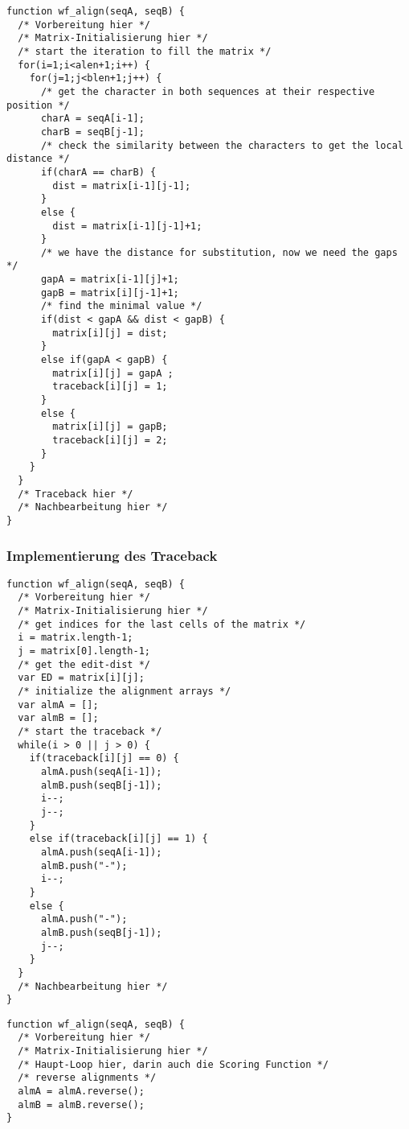 \begin{verbatim}
function wf_align(seqA, seqB) {
  /* Vorbereitung hier */  
  /* Matrix-Initialisierung hier */ 
  /* start the iteration to fill the matrix */
  for(i=1;i<alen+1;i++) {
    for(j=1;j<blen+1;j++) {      
      /* get the character in both sequences at their respective position */
      charA = seqA[i-1];
      charB = seqB[j-1];      
      /* check the similarity between the characters to get the local distance */
      if(charA == charB) {
        dist = matrix[i-1][j-1];
      }
      else {
        dist = matrix[i-1][j-1]+1;
      }      
      /* we have the distance for substitution, now we need the gaps */
      gapA = matrix[i-1][j]+1;
      gapB = matrix[i][j-1]+1;    
      /* find the minimal value */
      if(dist < gapA && dist < gapB) {
        matrix[i][j] = dist;
      }
      else if(gapA < gapB) {
        matrix[i][j] = gapA ;
        traceback[i][j] = 1;
      }
      else {
        matrix[i][j] = gapB;
        traceback[i][j] = 2;
      }
    }
  }
  /* Traceback hier */
  /* Nachbearbeitung hier */
}
\end{verbatim}


\subsubsection{\texorpdfstring{{Implementierung des
Traceback}}{Implementierung des Traceback}}

\begin{verbatim}
function wf_align(seqA, seqB) {
  /* Vorbereitung hier */
  /* Matrix-Initialisierung hier */
  /* get indices for the last cells of the matrix */
  i = matrix.length-1;
  j = matrix[0].length-1;
  /* get the edit-dist */
  var ED = matrix[i][j];
  /* initialize the alignment arrays */
  var almA = [];
  var almB = [];
  /* start the traceback */
  while(i > 0 || j > 0) {
    if(traceback[i][j] == 0) {
      almA.push(seqA[i-1]);
      almB.push(seqB[j-1]);
      i--;
      j--;
    }
    else if(traceback[i][j] == 1) {
      almA.push(seqA[i-1]);
      almB.push("-");
      i--;
    }
    else {
      almA.push("-");
      almB.push(seqB[j-1]);
      j--;
    }   
  }
  /* Nachbearbeitung hier */
}
\end{verbatim}



\begin{verbatim}
function wf_align(seqA, seqB) {
  /* Vorbereitung hier */
  /* Matrix-Initialisierung hier */
  /* Haupt-Loop hier, darin auch die Scoring Function */
  /* reverse alignments */
  almA = almA.reverse();
  almB = almB.reverse();
}
\end{verbatim}

